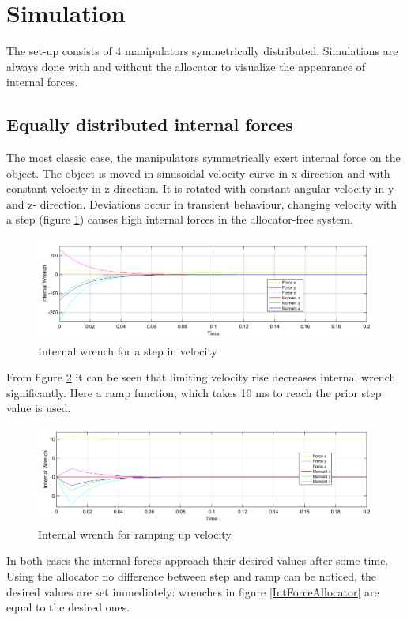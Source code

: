 \documentclass[conference]{IEEEtran}
\begin{document}
\section{Simulation}
The set-up consists of 4 manipulators symmetrically distributed. Simulations are always done with and without the allocator to visualize the appearance of internal forces.
\subsection{Equally distributed internal forces}  
The most classic case, the manipulators symmetrically exert internal force on the object. The object is moved in sinusoidal velocity curve in x-direction and with constant velocity in z-direction. It is rotated with constant angular velocity in y- and z- direction. Deviations occur in transient behaviour, changing velocity with a step (figure \ref{IntForceStep}) causes high internal forces in the allocator-free system. 
\begin{figure}
\includegraphics[width=\linewidth]{IntForceStep1}
\caption{Internal wrench for a step in velocity}
\label{IntForceStep}
\end{figure}
From figure \ref{IntForceRamp} it can be seen that limiting velocity rise decreases internal wrench significantly. Here a ramp function, which takes 10 ms to reach the prior step value is used.
\begin{figure}
\includegraphics[width=\linewidth]{IntForceRamp1}
\caption{Internal wrench for ramping up velocity}
\label{IntForceRamp}
\end{figure}
In both cases the internal forces approach their desired values after some time. Using the allocator no difference between step and ramp can be noticed, the desired values are set immediately: wrenches in figure \ref{IntForceAllocator} are equal to the desired ones.
\end{document}
